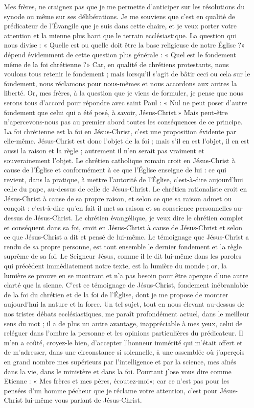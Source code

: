 Mes frères, ne craignez pas que je me permette d’anticiper sur les résolutions du synode ou même sur ses délibérations. Je me souviens que c’est en qualité de prédicateur de l’Évangile que je suis dans cette chaire, et je veux porter votre attention et la mienne plus haut que le terrain ecclésiastique. La question qui nous divise : « Quelle est ou quelle doit être la base religieuse de notre Église ?» dépend évidemment de cette question plus générale : « Quel est le fondement même de la foi chrétienne ?» Car, en qualité de chrétiens protestants, nous voulons tous retenir le fondement ; mais lorsqu’il s’agit de bâtir ceci ou cela sur le fondement, nous réclamons pour nous-mêmes et nous accordons aux autres la liberté. Or, mes frères, à la question que je viens de formuler, je pense que nous serons tous d’accord pour répondre avec saint Paul : « Nul ne peut poser d’autre fondement que celui qui a été posé, à savoir, Jésus-Christ.» Mais peut-être n’apercevons-nous pas au premier abord toutes les conséquences de ce principe. La foi chrétienne est la foi en Jésus-Christ, c’est une proposition évidente par elle-même. Jésus-Christ est donc l’objet de la foi ; mais s’il en est l’objet, il en est aussi la raison et la règle ; autrement il n’en serait pas vraiment et souverainement l’objet. Le chrétien catholique romain croit en Jésus-Christ à cause de l’Église et conformément à ce que l’Église enseigne de lui : ce qui revient, dans la pratique, à mettre l’autorité de l’Église, c’est-à-dire aujourd’hui celle du pape, au-dessus de celle de Jésus-Christ. Le chrétien rationaliste croit en Jésus-Christ à cause de sa propre raison, et selon ce que sa raison admet ou conçoit : c’est-à-dire qu’en fait il met sa raison et sa conscience personnelles au-dessus de Jésus-Christ. Le chrétien évangélique, je veux dire le chrétien complet et conséquent dans sa foi, croit en Jésus-Christ à cause de Jésus-Christ et selon ce que Jésus-Christ a dit et pensé de lui-même. Le témoignage que Jésus-Christ a rendu de sa propre personne, est tout ensemble le dernier fondement et la règle suprême de sa foi. Le Seigneur Jésus, comme il le dit lui-même dans les paroles qui précèdent immédiatement notre texte, est la lumière du monde ; or, la lumière se prouve en se montrant et n’a pas besoin pour être aperçue d’une autre clarté que la sienne. C’est ce témoignage de Jésus-Christ, fondement inébranlable de la foi du chrétien et de la foi de l’Église, dont je me propose de montrer aujourd’hui la nature et la force. Un tel sujet, tout en nous élevant au-dessus de nos tristes débats ecclésiastiques, me paraît profondément actuel, dans le meilleur sens du mot ; il a de plus un autre avantage, inappréciable à mes yeux, celui de reléguer dans l’ombre la personne et les opinions particulières du prédicateur. Il m’en a coûté, croyez-le bien, d’accepter l’honneur immérité qui m’était offert et de m’adresser, dans une circonstance si solennelle, à une assemblée où j’aperçois en grand nombre mes supérieurs par l’intelligence et par la science, mes aînés dans la vie, dans le ministère et dans la foi. Pourtant j’ose vous dire comme Etienne : « Mes frères et mes pères, écoutez-moi»; car ce n’est pas pour les pensées d’un homme pécheur que je réclame votre attention, c’est pour Jésus-Christ lui-même vous parlant de Jésus-Christ.


